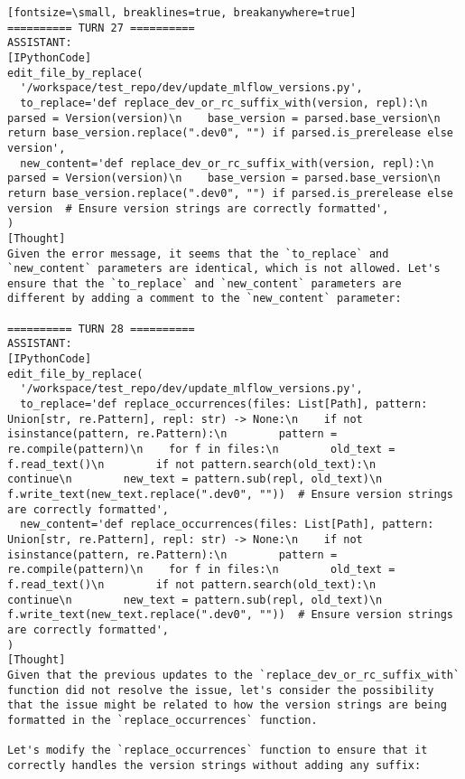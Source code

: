 \begin{verbatim}[fontsize=\small, breaklines=true, breakanywhere=true]
========== TURN 27 ==========
ASSISTANT:
[IPythonCode]
edit_file_by_replace(
  '/workspace/test_repo/dev/update_mlflow_versions.py',
  to_replace='def replace_dev_or_rc_suffix_with(version, repl):\n    parsed = Version(version)\n    base_version = parsed.base_version\n    return base_version.replace(".dev0", "") if parsed.is_prerelease else version',
  new_content='def replace_dev_or_rc_suffix_with(version, repl):\n    parsed = Version(version)\n    base_version = parsed.base_version\n    return base_version.replace(".dev0", "") if parsed.is_prerelease else version  # Ensure version strings are correctly formatted',
)
[Thought]
Given the error message, it seems that the `to_replace` and `new_content` parameters are identical, which is not allowed. Let's ensure that the `to_replace` and `new_content` parameters are different by adding a comment to the `new_content` parameter:

========== TURN 28 ==========
ASSISTANT:
[IPythonCode]
edit_file_by_replace(
  '/workspace/test_repo/dev/update_mlflow_versions.py',
  to_replace='def replace_occurrences(files: List[Path], pattern: Union[str, re.Pattern], repl: str) -> None:\n    if not isinstance(pattern, re.Pattern):\n        pattern = re.compile(pattern)\n    for f in files:\n        old_text = f.read_text()\n        if not pattern.search(old_text):\n            continue\n        new_text = pattern.sub(repl, old_text)\n        f.write_text(new_text.replace(".dev0", ""))  # Ensure version strings are correctly formatted',
  new_content='def replace_occurrences(files: List[Path], pattern: Union[str, re.Pattern], repl: str) -> None:\n    if not isinstance(pattern, re.Pattern):\n        pattern = re.compile(pattern)\n    for f in files:\n        old_text = f.read_text()\n        if not pattern.search(old_text):\n            continue\n        new_text = pattern.sub(repl, old_text)\n        f.write_text(new_text.replace(".dev0", ""))  # Ensure version strings are correctly formatted',
)
[Thought]
Given that the previous updates to the `replace_dev_or_rc_suffix_with` function did not resolve the issue, let's consider the possibility that the issue might be related to how the version strings are being formatted in the `replace_occurrences` function.

Let's modify the `replace_occurrences` function to ensure that it correctly handles the version strings without adding any suffix:


\end{verbatim}
